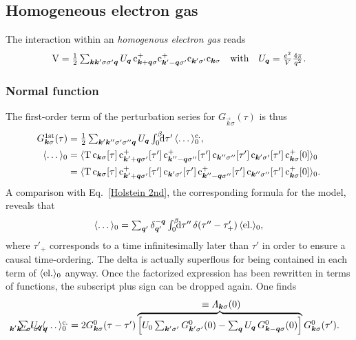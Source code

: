 \subsection{Homogeneous electron gas}

The interaction within an \emph{homogenous electron gas} reads
\cite[165]{Czycholl08}
%
\begin{align*}
    \op V = \frac 1 2 \sum_{\vec k \vec k' \sigma \sigma' \vec q} U_{\vec q} \,
    \op c_{\vec k + \vec q \sigma}^+
    \op c_{\vec k' - \vec q \sigma'}^+
    \op c_{\vec k' \sigma'}
    \op c_{\vec k \sigma}
    \quad \text{with} \quad
    U_{\vec q} = \frac{e^2}{V} \frac{4 \pi}{q^2}.
\end{align*}

\subsubsection{Normal  function}

The first-order term of the  perturbation series for
$G_{\vec k \sigma}(\tau)$ is thus
%
\begin{align*}
    G \super{1st}_{\vec k \sigma}(\tau) &= \frac 1 2
    \sum_{\vec k' \vec k'' \sigma' \sigma'' \vec q} U_{\vec q}
    \int \from 0 \till \beta \D \tau' \, \av \dots_0 \super{c.},
    \\
    \av \dots_0 &= \av{\op T \,
        \op c_{\vec k \sigma}[\tau] \,
        \op c_{\vec k' + \vec q \sigma'}^+[\tau'] \,
        \op c_{\vec k'' - \vec q \sigma''}^+[\tau'] \,
        \op c_{\vec k'' \sigma''}[\tau'] \,
        \op c_{\vec k' \sigma'}[\tau'] \,
        \op c_{\vec k \sigma}^+[0]
    }_0 \\ &= \av{\op T \,
        \op c_{\vec k \sigma}[\tau] \,
        \op c_{\vec k' + \vec q \sigma'}^+[\tau'] \,
        \op c_{\vec k' \sigma'}[\tau'] \,
        \op c_{\vec k'' - \vec q \sigma''}^+[\tau'] \,
        \op c_{\vec k'' \sigma''}[\tau'] \,
        \op c_{\vec k \sigma}^+[0]
    }_0.
\end{align*}
%
A comparison with Eq.~\ref{Holstein 2nd}, the corresponding formula for the
 model, reveals that
%
\begin{align*}
    \av \dots_0 =
    \sum_{\vec q'} \delta_{\vec q'}^{-\vec q}
    \int \from 0 \till \beta \D \tau'' \,
    \delta(\tau'' - \tau'_+) \, \av{\text{el.}}_0,
\end{align*}
%
where $\tau'_+$ corresponds to a time infinitesimally later than $\tau'$ in
order to ensure a causal time-ordering. The  delta is actually
superflous for being contained in each term of $\langle\text{el.}\rangle_0$ anyway. Once
the factorized expression has been rewritten in terms of  functions,
the subscript plus sign can be dropped again. One finds
%
\begin{align*}
    \sum_{\mathclap{\vec k' \vec k'' \sigma' \sigma'' \vec q}}
    U_{\vec q} \av \dots_0 \super{c.} =
    2 G^0_{\vec k \sigma}(\tau - \tau')
    \hyper{\Big[
        U_0 \sum_{\vec k' \sigma'} G^0_{\vec k' \sigma'}(0) -
        \sum_{\vec q} U_{\vec q} \, G^0_{\vec k - \vec q \sigma}(0)
    \Big]}{\equiv \Lambda_{\vec k \sigma}(0)}
    G^0_{\vec k \sigma}(\tau').
\end{align*}

